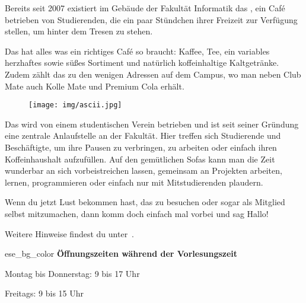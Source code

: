 \pagebreak


Bereits seit 2007 existiert im Gebäude der Fakultät Informatik das \ascii{}, ein Café betrieben von Studierenden, die ein paar Stündchen ihrer Freizeit zur Verfügung stellen, um hinter dem Tresen zu stehen.

Das \ascii{} hat alles was ein richtiges Café so braucht: Kaffee, Tee, ein variables herzhaftes sowie süßes Sortiment und natürlich koffeinhaltige Kaltgetränke.
Zudem zählt das \ascii{} zu den wenigen Adressen auf dem Campus, wo man neben Club Mate auch Kolle Mate und Premium Cola erhält.

\begin{figure}[h!]
    \centering
    \texttt{[image: img/ascii.jpg]}
\end{figure}

Das \ascii{} wird von einem studentischen Verein betrieben und ist seit seiner Gründung eine zentrale Anlaufstelle an der Fakultät.
Hier treffen sich Studierende und Beschäftigte, um ihre Pausen zu verbringen, zu arbeiten oder einfach ihren Koffeinhaushalt aufzufüllen.
Auf den gemütlichen Sofas kann man die Zeit wunderbar an sich vorbeistreichen lassen, gemeinsam an Projekten arbeiten, lernen, programmieren oder einfach nur mit Mitstudierenden plaudern.

Wenn du jetzt Lust bekommen hast, das \ascii{} zu besuchen oder sogar als Mitglied selbst mitzumachen, dann komm doch einfach mal vorbei und sag Hallo!

Weitere Hinweise findest du unter~.

\begin{awesomeblock}{2pt}{\faCalendar*[regular]}{ese_bg_color}
    \textbf{Öffnungszeiten während der Vorlesungszeit}

    Montag bis Donnerstag: 9 bis 17 Uhr

    Freitags: 9 bis 15 Uhr
\end{awesomeblock}
